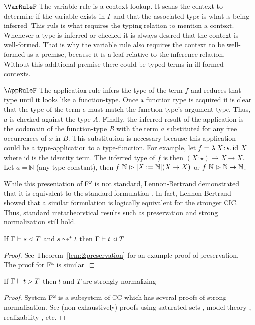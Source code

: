 $\VarRuleF$ The variable rule is a context lookup.
It scans the context to determine if the variable exists in $\Gamma$ and that the associated type is what is being inferred.
This rule is what requires the typing relation to mention a context.
Whenever a type is inferred or checked it is always desired that the context is well-formed.
That is why the variable rule also requires the context to be well-formed as a premise, because it is a leaf relative to the inference relation.
Without this additional premise there could be typed terms in ill-formed contexts.

$\AppRuleF$ The application rule infers the type of the term $f$ and reduces that type until it looks like a function-type.
Once a function type is acquired it is clear that the type of the term $a$ must match the function-type's argument-type.
Thus, $a$ is checked against the type $A$.
Finally, the inferred result of the application is the codomain of the function-type $B$ with the term $a$ substituted for any free occurrences of $x$ in $B$.
This substitution is necessary because this application could be a type-application to a type-function.
For example, let $f = {\lambda}\, X\! : \! \star.\, \text{id}\ X$ where id is the identity term.
The inferred type of $f$ is then $(X : \star) \to X \to X$.
Let $a = \mathbb{N}$ (any type constant), then $f\ \mathbb{N} \vartriangleright [X := \mathbb{N}](X \to X)$ or $f\ \mathbb{N} \infr \mathbb{N} \to \mathbb{N}$.

While this presentation of F$^\omega$ is not standard, Lennon-Bertrand demonstrated that it is equivalent to the standard formulation \cite{lennon2021}.
In fact, Lennon-Bertrand showed that a similar formulation is logically equivalent for the stronger CIC.
Thus, standard metatheoretical results such as preservation and strong normalization still hold.

\begin{lemma}
    If $\Gamma \vdash s \vartriangleleft T$ and $s \leadsto^* t$ then $\Gamma \vdash t \vartriangleleft T$
\end{lemma}
\begin{proof}
    See Theorem~\ref{lem:2:preservation} for an example proof of preservation.
    The proof for F$^\omega$ is similar.
\end{proof}

\begin{theorem}
    If $\Gamma \vdash t \vartriangleright T$ then $t$ and $T$ are strongly normalizing
\end{theorem}
\begin{proof}
    System F$^\omega$ is a subsystem of CC which has several proofs of strong normalization.
    See (non-exhaustively) proofs using saturated sets \cite{geuvers1994_sn_satset}, model theory \cite{terlouw1995_sn}, realizability \cite{ong1993}, etc.
\end{proof}

